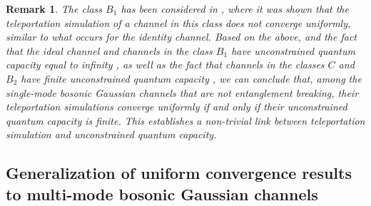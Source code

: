 \documentclass[apsrev,twocolumn]{revtex4-1}%
\newtheorem{remark}[theorem]{Remark}
\begin{document}
\begin{remark}
The class $B_{1}$ has been considered in \cite{P18}, where it was
shown that the teleportation simulation of a channel in this class does not
converge uniformly, similar to what occurs for the identity channel. Based on
the above, and the fact that the ideal channel and channels in the class
$B_{1}$ have unconstrained quantum capacity equal to infinity
\cite{Holevo2007}, as well as the fact that channels in the classes $C$ and
$B_{2}$ have finite unconstrained quantum capacity \cite{SWAT17}, we can
conclude that, among the single-mode bosonic Gaussian channels that are not
entanglement breaking, their teleportation simulations converge uniformly if
and only if their unconstrained quantum capacity is finite. This establishes a
non-trivial link between teleportation simulation and unconstrained quantum capacity.
\end{remark}

\subsection{Generalization of uniform convergence results to multi-mode bosonic
Gaussian channels}
\end{document}
